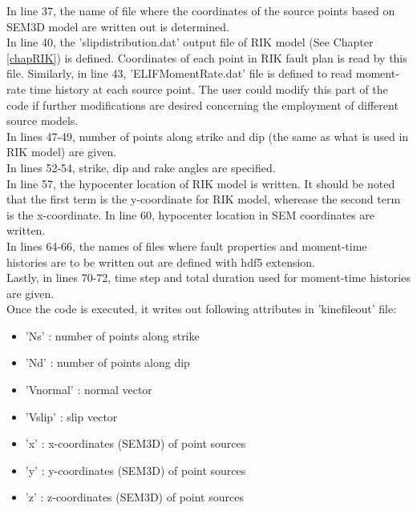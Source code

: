 In line 37, the name of file where the coordinates of the source points based on SEM3D model are written out is determined. \\

In line 40, the 'slipdistribution.dat' output file of RIK model (See Chapter \ref{chapRIK}) is defined. Coordinates of each point in RIK fault plan is read by this file. Similarly, in line 43, 'ELIF\textunderscore MomentRate.dat' file is defined to read moment-rate time history at each source point. The user could modify this part of the code if further modifications are desired concerning the employment of different source models. \\


In lines 47-49, number of points along strike and dip (the same as what is used in RIK model) are given. \\

In lines 52-54, strike, dip and rake angles are specified.  \\

In line 57, the hypocenter location of RIK model is written. It should be noted that the first term is the y-coordinate for RIK model, wherease the second term is the x-coordinate. In line 60, hypocenter location in SEM coordinates are written. \\

In lines 64-66, the names of files where fault properties and moment-time histories are to be written out are defined with hdf5 extension. \\


Lastly, in lines 70-72, time step and total duration used for moment-time histories are given. \\
 


Once the code is executed, it writes out following attributes in 'kinefile\textunderscore out' file:

\begin{itemize}
\item 'Ns'      : number of points along strike \\
\item 'Nd'      : number of points along dip    \\
\item 'Vnormal' : normal vector \\
\item 'Vslip'   : slip vector   \\
\item 'x'       : x-coordinates (SEM3D) of point sources \\
\item 'y'       : y-coordinates (SEM3D) of point sources \\
\item 'z'       : z-coordinates (SEM3D) of point sources \\
\end{itemize}



